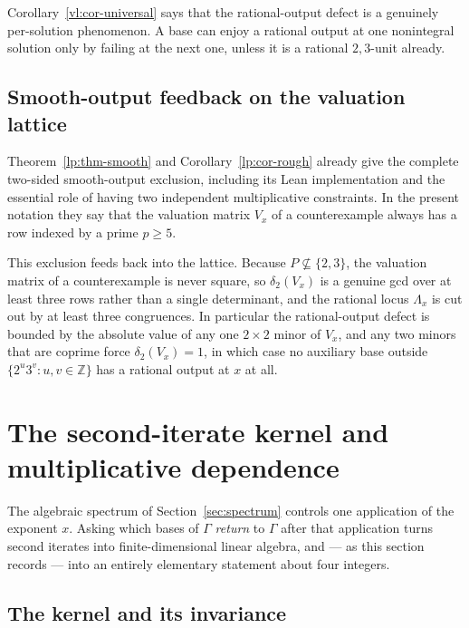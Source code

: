 \documentclass[11pt,oneside]{article}
\theoremstyle{definition}
\theoremstyle{remark}
\newcommand{\Z}{\mathbb Z}
\newcommand{\GammaSat}{\Gamma}
\begin{document}
Corollary~\ref{vl:cor-universal} says that the rational-output defect is a genuinely
per-solution phenomenon.  A base can enjoy a rational output at one nonintegral solution only
by failing at the next one, unless it is a rational $2,3$-unit already.

\subsection{Smooth-output feedback on the valuation lattice}

Theorem~\ref{lp:thm-smooth} and Corollary~\ref{lp:cor-rough} already give the complete
two-sided smooth-output exclusion, including its Lean implementation and the essential role
of having two independent multiplicative constraints.  In the present notation they say
that the valuation matrix $V_x$ of a counterexample always has a row indexed by a prime
$p\ge5$.

This exclusion feeds back into the lattice.  Because $P\not\subseteq\{2,3\}$, the
valuation matrix of a counterexample is never square, so $\delta_2(V_x)$ is a genuine gcd over
at least three rows rather than a single determinant, and the rational locus $\Lambda_x$ is cut
out by at least three congruences.  In particular the rational-output defect is bounded by the
absolute value of any one $2\times2$ minor of $V_x$, and any two minors that are coprime force
$\delta_2(V_x)=1$, in which case no auxiliary base outside $\{2^u3^v:u,v\in\Z\}$ has a rational
output at $x$ at all.

\section{The second-iterate kernel and multiplicative dependence}
\label{sec:kernel}

The algebraic spectrum of Section~\ref{sec:spectrum} controls one application of the exponent
$x$.  Asking which bases of $\GammaSat$ \emph{return} to $\GammaSat$ after that application
turns second iterates into finite-dimensional linear algebra, and --- as this section records
--- into an entirely elementary statement about four integers.

\subsection{The kernel and its invariance}
\end{document}
